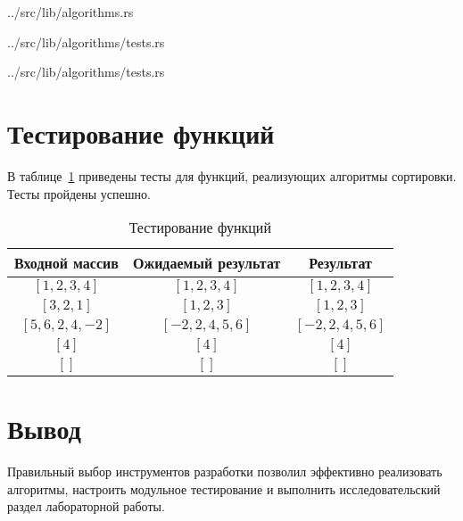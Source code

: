 \begin{lstinputlisting}[
	caption={Алгоритм сортировки выбором},
	label={lst:selection},
	style={rust},
	linerange={21-39}
]{../src/lib/algorithms.rs}
\end{lstinputlisting}

\begin{lstinputlisting}[
	caption={Пример реализации теста},
	label={lst:tests},
	style={rust},
	linerange={29-38}
]{../src/lib/algorithms/tests.rs}
\end{lstinputlisting}

\begin{lstinputlisting}[
	caption={Пример реализации бенчмарка},
	label={lst:benches},
	style={rust},
	linerange={66-70}
]{../src/lib/algorithms/tests.rs}
\end{lstinputlisting}

\section{Тестирование функций}

В таблице~\ref{tbl:test} приведены тесты для функций, реализующих алгоритмы сортировки. Тесты пройдены успешно.

\begin{table}[h!]
	\begin{center}
		\begin{tabular}{|c|c|c|}
			\hline
			Входной массив & Ожидаемый результат & Результат \\ 
			\hline
			$[1,2,3,4]$ & $[1,2,3,4]$  & $[1,2,3,4]$\\
			$[3,2,1]$  & $[1,2,3]$ & $[1,2,3]$\\
			$[5,6,2,4,-2]$  & $[-2,2,4,5,6]$  & $[-2,2,4,5,6]$\\
			$[4]$  & $[4]$  & $[4]$\\
			$[]$  & $[]$  & $[]$\\
			\hline
		\end{tabular}
		\caption{\label{tbl:test}Тестирование функций}
	\end{center}
\end{table}

\section*{Вывод}

Правильный выбор инструментов разработки позволил эффективно реализовать алгоритмы, настроить модульное тестирование и выполнить исследовательский раздел лабораторной работы.
